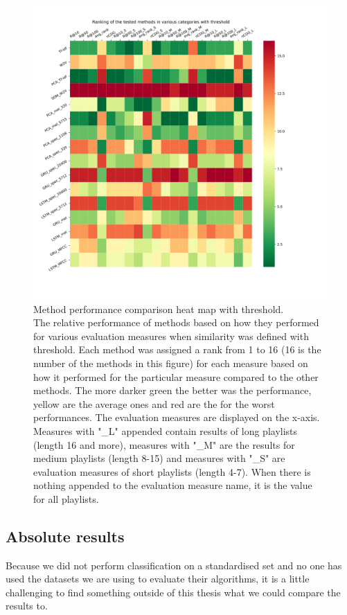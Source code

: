 \begin{figure}[h]
    \centering
	\includegraphics[width=1\linewidth]{./img/threshold_method_ranking.png}
	\caption[Method performance comparison heat map with threshold applied]{Method performance comparison heat map with threshold. \\ The relative performance of methods based on how they performed for various evaluation measures when similarity was defined with threshold. Each method was assigned a rank from 1 to 16 (16 is the number of the methods in this figure) for each measure based on how it performed for the particular measure compared to the other methods. The more darker green the better was the performance, yellow are the average ones and red are the for the worst performances. The evaluation measures are displayed on the x-axis. Measures with "\_L" appended contain results of long playlists (length 16 and more), measures with "\_M" are the results for medium playlists (length 8-15) and measures with "\_S" are evaluation measures of short playlists (length 4-7). When there is nothing appended to the evaluation measure name, it is the value for all playlists.}
	\label{fig:threshold_method_comparison}
\end{figure}

\subsection{Absolute results}\label{ssec:absolute_results}
Because we did not perform classification on a standardised set and no one has used the datasets we are using to evaluate their algorithms, it is a little challenging to find something outside of this thesis what we could compare the results to.

